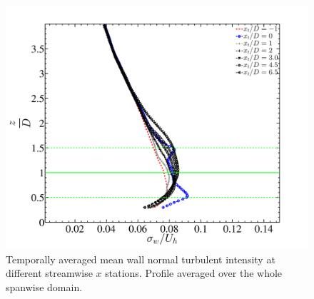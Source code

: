\begin{figure}
\centering
\includegraphics[width = 0.8\linewidth]{stats/wfluc_Npoints_avg.pdf}
\caption[Mean $\sigma_{w}$ at $x$ stations 3]{Temporally averaged mean wall normal turbulent intensity at different streamwise $x$ stations. Profile averaged over the whole spanwise domain.}\label{fig:wstat3}
\end{figure}




